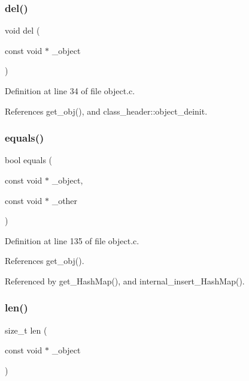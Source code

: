 \subsubsection{\texorpdfstring{del()}{del()}}
{\footnotesize\ttfamily void del (\begin{DoxyParamCaption}\item[{const void $\ast$}]{\+\_\+object }\end{DoxyParamCaption})}



Definition at line 34 of file object.\+c.



References get\+\_\+obj(), and class\+\_\+header\+::object\+\_\+deinit.

\mbox{\label{group__common_ga4b83176929aeea62524d2a126d3c897f}} 
\subsubsection{\texorpdfstring{equals()}{equals()}}
{\footnotesize\ttfamily bool equals (\begin{DoxyParamCaption}\item[{const void $\ast$}]{\+\_\+object,  }\item[{const void $\ast$}]{\+\_\+other }\end{DoxyParamCaption})}



Definition at line 135 of file object.\+c.



References get\+\_\+obj().



Referenced by get\+\_\+\+Hash\+Map(), and internal\+\_\+insert\+\_\+\+Hash\+Map().

\mbox{\label{group__common_ga15be7f4a5b9c979feb83b76278f6716c}} 
\subsubsection{\texorpdfstring{len()}{len()}}
{\footnotesize\ttfamily size\+\_\+t len (\begin{DoxyParamCaption}\item[{const void $\ast$}]{\+\_\+object }\end{DoxyParamCaption})}



